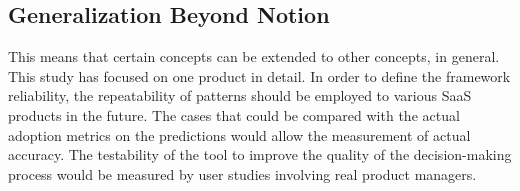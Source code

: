 \subsection{Generalization Beyond Notion}
This means that certain concepts can be extended to other concepts, in general. This study has focused on one product in detail. In order to define the framework reliability, the repeatability of patterns should be employed to various SaaS products in the future. The cases that could be compared with the actual adoption metrics on the predictions would allow the measurement of actual accuracy. The testability of the tool to improve the quality of the decision-making process would be measured by user studies involving real product managers.
